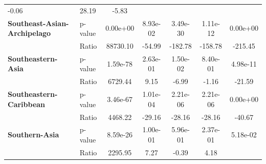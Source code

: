 \begin{table}[H]
{\begin{tabular}{llccccc}
            -0.06
                                                                & 28.19    &
            -5.83
            \\
            \textbf{Southeast-Asian-Archipelago}                & p-value  &
            0.00e+00                                            & 8.93e-02 &
            3.49e-30                                            & 1.11e-12 &
            0.00e+00
            \\
            \textbf{}                                           & Ratio    &
            88730.10                                            & -54.99   &
            -182.78
                                                                & -158.78  &
            -215.45
            \\
            \textbf{Southeastern-Asia}                          & p-value  &
            1.59e-78                                            & 2.63e-01 &
            1.50e-02                                            & 8.40e-01 &
            4.98e-11
            \\
            \textbf{}                                           & Ratio    &
            6729.44                                             & 9.15     &
            -6.99
                                                                & -1.16    &
            -21.59
            \\
            \textbf{Southeastern-Caribbean}                     & p-value  &
            3.46e-67                                            & 1.01e-04 &
            2.21e-06                                            & 2.21e-06 &
            0.00e+00
            \\
            \textbf{}                                           & Ratio    &
            4468.22                                             & -29.16   &
            -28.16
                                                                & -28.16   &
            -40.67
            \\
            \textbf{Southern-Asia}                              & p-value  &
            8.59e-26                                            & 1.00e-01 &
            5.96e-01                                            & 2.37e-01 &
            5.18e-02
            \\
            \textbf{}                                           & Ratio    &
            2295.95                                             & 7.27     &
            -0.39
                                                                & 4.18     &

\end{tabular}}
\end{table}

